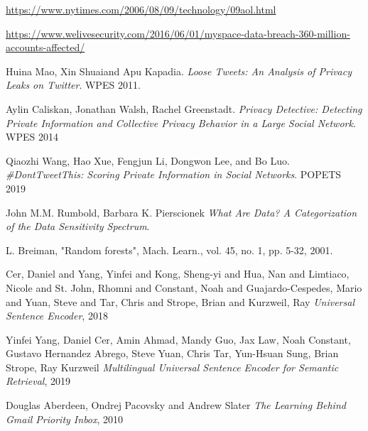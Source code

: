 \begin{thebibliography}{9}

\url{https://www.nytimes.com/2006/08/09/technology/09aol.html}

\url{https://www.welivesecurity.com/2016/06/01/myspace-data-breach-360-million-accounts-affected/}

Huina Mao, Xin Shuaiand Apu Kapadia.\newline
\textit{Loose Tweets: An Analysis of Privacy Leaks on Twitter}. \newline
WPES 2011.

Aylin Caliskan, Jonathan Walsh, Rachel Greenstadt.\newline
\textit{Privacy Detective: Detecting Private Information and Collective Privacy Behavior in a Large Social Network}.\newline
WPES 2014

Qiaozhi Wang, Hao Xue, Fengjun Li, Dongwon Lee, and Bo Luo.\newline
\textit{\#DontTweetThis: Scoring Private Information in Social Networks}. \newline
POPETS 2019

John M.M. Rumbold, Barbara K. Pierscionek\newline
\textit{What Are Data? A Categorization of the Data Sensitivity Spectrum}.

L. Breiman, "Random forests",\newline
Mach. Learn., vol. 45, no. 1, pp. 5-32, 2001.

Cer, Daniel  and Yang, Yinfei  and Kong, Sheng-yi  and
Hua, Nan  and Limtiaco, Nicole  and St. John, Rhomni  and
Constant, Noah  and Guajardo-Cespedes, Mario  and Yuan, Steve  and
Tar, Chris  and Strope, Brian  and Kurzweil, Ray\newline
\textit{Universal Sentence Encoder}, 2018

Yinfei Yang, Daniel Cer, Amin Ahmad, Mandy Guo, Jax Law, Noah Constant, Gustavo Hernandez Abrego, Steve Yuan, Chris Tar, Yun-Hsuan Sung, Brian Strope, Ray Kurzweil
\textit{Multilingual Universal Sentence Encoder for Semantic Retrieval}, 2019

Douglas Aberdeen, Ondrej Pacovsky  and Andrew Slater\newline
\textit{The Learning Behind Gmail Priority Inbox}, 2010


\end{thebibliography}
